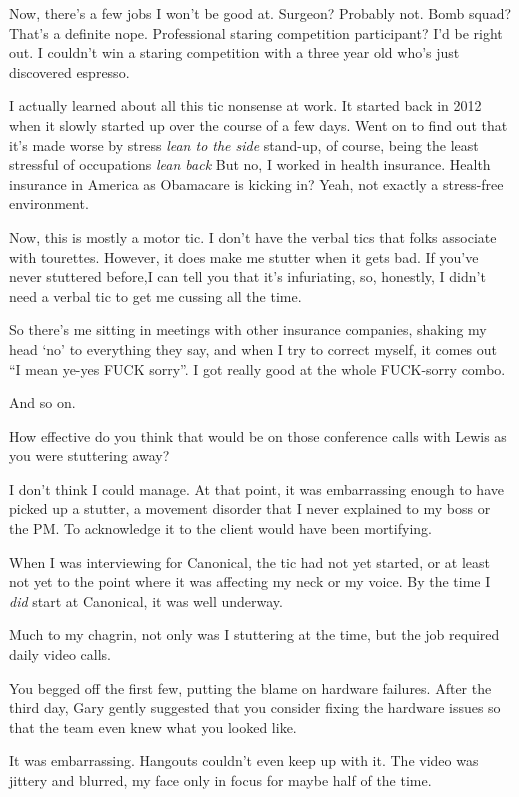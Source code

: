 \begin{paracol}{2}
\begin{leftcolumn}
Now, there's a few jobs I won't be good at. Surgeon? Probably not. Bomb squad? That's a definite nope. Professional staring competition participant? I'd be right out. I couldn't win a staring competition with a three year old who's just discovered espresso.

I actually learned about all this tic nonsense at work. It started back in 2012 when it slowly started up over the course of a few days. Went on to find out that it's made worse by stress \emph{lean to the side} stand-up, of course, being the least stressful of occupations \emph{lean back} But no, I worked in health insurance. Health insurance in America as Obamacare is kicking in? Yeah, not exactly a stress-free environment.

Now, this is mostly a motor tic. I don't have the verbal tics that folks associate with tourettes. However, it does make me stutter when it gets bad. If you've never stuttered before,I can tell you that it's infuriating, so, honestly, I didn't need a verbal tic to get me cussing all the time.

So there's me sitting in meetings with other insurance companies, shaking my head `no' to everything they say, and when I try to correct myself, it comes out ``I mean ye-yes FUCK sorry''. I got really good at the whole FUCK-sorry combo.

And so on.

\begin{ally}
How effective do you think that would be on those conference calls with Lewis as you were stuttering away?
\end{ally}
I don't think I could manage. At that point, it was embarrassing enough to have picked up a stutter, a movement disorder that I never explained to my boss or the PM. To acknowledge it to the client would have been mortifying.
\newpage

\noindent When I was interviewing for Canonical, the tic had not yet started, or at least not yet to the point where it was affecting my neck or my voice. By the time I \emph{did} start at Canonical, it was well underway.

Much to my chagrin, not only was I stuttering at the time, but the job required daily video calls.

\begin{ally}
You begged off the first few, putting the blame on hardware failures. After the third day, Gary gently suggested that you consider fixing the hardware issues so that the team even knew what you looked like.
\end{ally}
It was embarrassing. Hangouts couldn't even keep up with it. The video was jittery and blurred, my face only in focus for maybe half of the time.


\end{leftcolumn}
\end{paracol}
